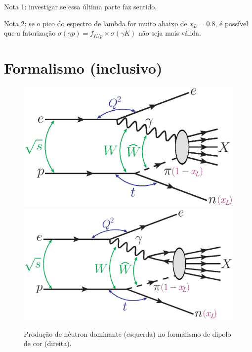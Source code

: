 \documentclass[a4paper,12pt]{article} %
\begin{document}
Nota 1: investigar se essa última parte faz sentido.

Nota 2: se o pico do espectro de lambda for muito abaixo de $x_L=0.8$, 
é possível que a fatorização $\sigma(\gamma p)= f_{K/p}\times \sigma(\gamma K)$
não seja mais válida.


\newpage
\section{Formalismo (inclusivo)}
\begin{figure}[!h]
 \centering
 \includegraphics[scale=0.65]{../figures/diagrams/ln_inc}
 \includegraphics[scale=0.65]{../figures/diagrams/ln_inc_dip_tese}
 \caption{Produção de nêutron dominante (esquerda) no formalismo de dipolo de cor (direita).}
 \label{fig:ln_inc}
\end{figure}
\end{document}

